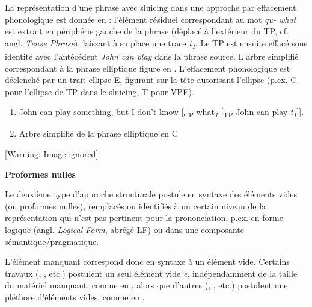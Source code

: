 La représentation d'une phrase avec sluicing dans une approche par effacement phonologique est donnée en  : l'élément résiduel correspondant au mot \textit{qu- what} est extrait en périphérie gauche de la phrase (déplacé à l'extérieur du TP, cf. angl. \textit{Tense Phrase}), laissant à sa place une trace \textit{t}\textit{\textsubscript{1}}. Le TP est ensuite effacé sous identité avec l'antécédent \textit{John can play} dans la phrase source. L'arbre simplifié correspondant à la phrase elliptique figure en . L'effacement phonologique est déclenché par un trait ellipse E, figurant sur la tête autorisant l'ellipse (p.ex. C pour l'ellipse de TP dans le sluicing, T pour VPE).  


\begin{enumerate}
\item \label{bkm:Ref305877748}John can play something, but I don't know [\textsubscript{CP} what\textit{\textsubscript{1}} [\textsubscript{TP} John can play \textit{t}\textit{\textsubscript{1}}]].  

\item \label{bkm:Ref305948516}Arbre simplifié de la phrase elliptique en   C 


\end{enumerate}
{   [Warning: Image ignored] %
} 

{\bfseries
Proformes nulles}

Le deuxième type d'approche structurale postule en syntaxe des éléments vides (ou proformes nulles), remplacés ou identifiés à un certain niveau de la représentation qui n'est pas pertinent pour la prononciation, p.ex. en forme logique (angl. \textit{Logical Form}, abrégé LF) ou dans une composante sémantique/pragmatique.

L'élément manquant correspond donc en syntaxe à un élément vide. Certains travaux (\citet{Hardt1993}, \citet{Lobeck1995}, etc.) postulent un seul élément vide \textit{e}, indépendamment de la taille du matériel manquant, comme en , alors que d'autres (\citet{Wasow1972}, \citet{Ludlow2005}, etc.) postulent une pléthore d'éléments vides, comme en .



